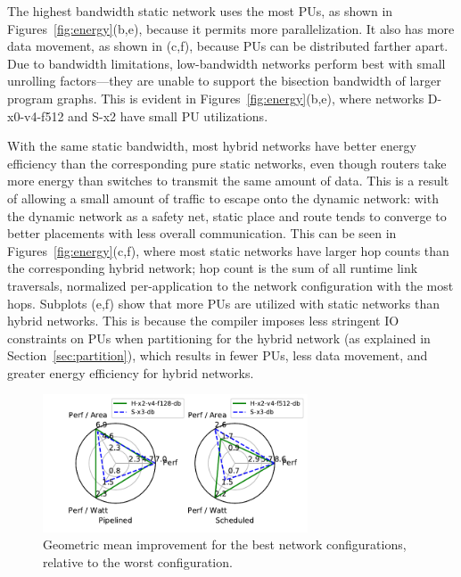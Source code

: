 The highest bandwidth static network uses the most PUs, as shown in Figures~\ref{fig:energy}(b,e), because it permits more parallelization. 
It also has more data movement, as shown in (c,f), because PUs can be distributed farther apart. 
Due to bandwidth limitations, low-bandwidth networks perform best with small unrolling factors---they are unable to support the bisection bandwidth of larger program graphs.
This is evident in Figures~\ref{fig:energy}(b,e), where networks D-x0-v4-f512 and S-x2 have small PU utilizations.

With the same static bandwidth, most hybrid networks have better energy efficiency than the corresponding pure static networks, even though routers take more energy than switches to transmit the same amount of data.
This is a result of allowing a small amount of traffic to escape onto the dynamic network: with the dynamic network as a safety net, static place and route tends to converge to better placements with less overall communication.
This can be seen in Figures~\ref{fig:energy}(c,f), where most static networks have larger hop counts than the corresponding hybrid network; hop count is the sum of all runtime link traversals, normalized per-application to the network configuration with the most hops.
Subplots (e,f) show that more PUs are utilized with static networks than hybrid networks.
This is because the compiler imposes less stringent IO constraints on PUs when partitioning for the hybrid network (as explained in Section~\ref{sec:partition}), which results in fewer PUs, less data movement, and greater energy efficiency for hybrid networks.

\begin{figure}
  \centering
\includegraphics[width=0.7\textwidth]{network/figs/radar_best.pdf}
  \caption{Geometric mean improvement for the best network configurations, relative to the worst configuration.}\label{fig:radar_best}
\end{figure}

